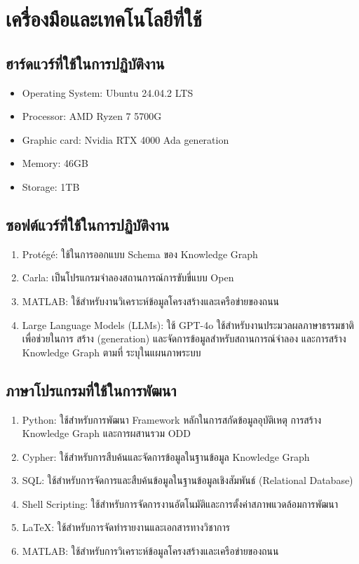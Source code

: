 \section{เครื่องมือและเทคโนโลยีที่ใช้}\label{sec:tools-and-tech}
\subsection{ฮาร์ดแวร์ที่ใช้ในการปฏิบัติงาน}\label{subsec:hardware-used}
\begin{itemize}
\item Operating System: Ubuntu 24.04.2 LTS
\item Processor: AMD Ryzen 7 5700G
\item Graphic card: Nvidia RTX 4000 Ada generation
\item Memory: 46GB
\item Storage: 1TB
\end{itemize}

\subsection{ซอฟต์แวร์ที่ใช้ในการปฏิบัติงาน}\label{subsec:software-used}
\begin{enumerate}[label=\arabic*.)]
    \item Protégé: ใช้ในการออกแบบ Schema ของ Knowledge Graph
    \item Carla: เป็นโปรแกรมจำลองสถานการณ์การขับขี่แบบ Open
    \item MATLAB: ใช้สำหรับงานวิเคราะห์ข้อมูลโครงสร้างและเครือข่ายของถนน
    \item Large Language Models (LLMs): ใช้ GPT-4o ใช้สำหรับงานประมวลผลภาษาธรรมชาติ เพื่อช่วยในการ สร้าง (generation) และจัดการข้อมูลสำหรับสถานการณ์จำลอง และการสร้าง Knowledge Graph ตามที่ ระบุในแผนภาพระบบ
\end{enumerate}

\subsection{ภาษาโปรแกรมที่ใช้ในการพัฒนา}\label{subsec:programming-languages}
\begin{enumerate}[label=\arabic*.)]
\item Python: ใช้สำหรับการพัฒนา Framework หลักในการสกัดข้อมูลอุบัติเหตุ การสร้าง Knowledge Graph และการผสานรวม ODD
\item Cypher: ใช้สำหรับการสืบค้นและจัดการข้อมูลในฐานข้อมูล Knowledge Graph
\item SQL: ใช้สำหรับการจัดการและสืบค้นข้อมูลในฐานข้อมูลเชิงสัมพันธ์ (Relational Database)
\item Shell Scripting: ใช้สำหรับการจัดการงานอัตโนมัติและการตั้งค่าสภาพแวดล้อมการพัฒนา
\item LaTeX: ใช้สำหรับการจัดทำรายงานและเอกสารทางวิชาการ
\item MATLAB: ใช้สำหรับการวิเคราะห์ข้อมูลโครงสร้างและเครือข่ายของถนน
\end{enumerate}

